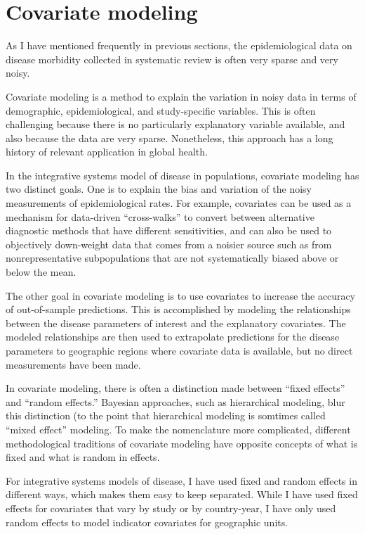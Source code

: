 \chapter{Covariate modeling}
\label{theory-covariate_modeling}
As I have mentioned frequently in previous sections, the
epidemiological data on disease morbidity collected in systematic
review is often very sparse and very noisy.

Covariate modeling is a method to explain the variation in noisy
data in terms of demographic, epidemiological, and study-specific
variables.  This is often challenging because there is no particularly
explanatory variable available, and also because the data are very
sparse.  Nonetheless, this approach has a long history of relevant
application in global health.\cite{girosi_demographic_2008,jon_wakefield_bayesian_1996,TK_at_least_3_more_citations,TK_at_least_3_more_citations,TK_at_least_3_more_citations}

In the integrative systems model of disease in populations, covariate
modeling has two distinct goals.  One is to
explain the bias and variation of the noisy measurements of
epidemiological rates.  For example, covariates can be used as a mechanism
for data-driven ``cross-walks'' to convert between alternative diagnostic methods
that have different sensitivities, and can also be used to
objectively down-weight data that comes from a noisier source such as
from nonrepresentative subpopulations that are not systematically
biased above or below the mean.

The other goal in covariate modeling is to use covariates
to increase the accuracy of out-of-sample predictions.  This
is accomplished by modeling the relationships between the disease
parameters of interest and the explanatory covariates. The modeled
relationships are then used to extrapolate predictions for the disease
parameters to geographic regions where covariate data is available,
but no direct measurements have been made.

In covariate modeling, there is often a distinction made between
``fixed effects'' and ``random effects.''  Bayesian approaches, such
as hierarchical modeling, blur this distinction (to the point that
hierarchical modeling is somtimes called ``mixed effect'' modeling.
\cite{Gelman_Multilevel_2005}  To make the nomenclature more
complicated, different methodological traditions of covariate modeling
have opposite concepts of what is fixed and what is random in effects.

For integrative systems models of disease, I have used fixed and
random effects in different ways, which makes them easy to keep
separated.  While I have used fixed effects for covariates that vary
by study or by country-year, I have only used random effects to model
indicator covariates for geographic units.

